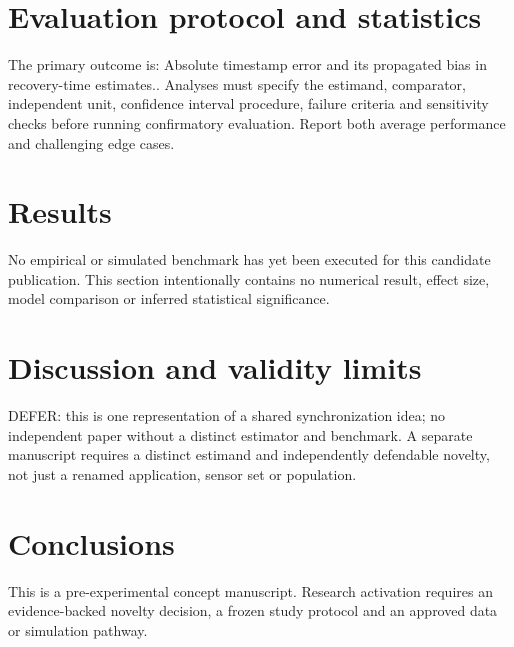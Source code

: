 \documentclass[11pt,a4paper]{article}
\begin{document}
\section{Evaluation protocol and statistics}
The primary outcome is: Absolute timestamp error and its propagated bias in recovery-time estimates.. Analyses must specify the estimand, comparator, independent unit, confidence interval procedure, failure criteria and sensitivity checks before running confirmatory evaluation. Report both average performance and challenging edge cases.
\section{Results}
No empirical or simulated benchmark has yet been executed for this candidate publication. This section intentionally contains no numerical result, effect size, model comparison or inferred statistical significance.
\section{Discussion and validity limits}
DEFER: this is one representation of a shared synchronization idea; no independent paper without a distinct estimator and benchmark. A separate manuscript requires a distinct estimand and independently defendable novelty, not just a renamed application, sensor set or population.
\section{Conclusions}
This is a pre-experimental concept manuscript. Research activation requires an evidence-backed novelty decision, a frozen study protocol and an approved data or simulation pathway.
\end{document}
